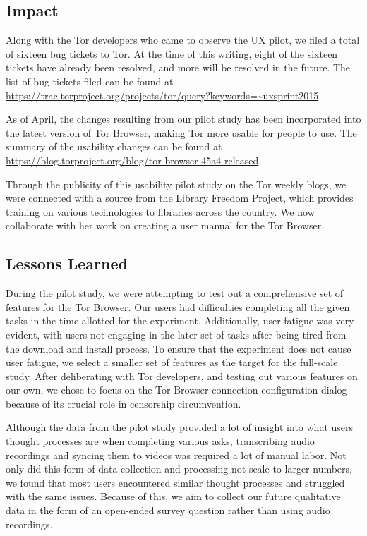 \documentclass[letterpaper,twocolumn,11pt]{article}
\begin{document}
\subsection{Impact}
\indent \indent Along with the Tor developers who came to observe the UX pilot, we filed 
a total of sixteen bug tickets to Tor. At the time of  this writing, eight of the sixteen tickets 
have already been resolved, and more will be resolved in the future.  The list of bug
tickets filed can be found at \url{https://trac.torproject.org/projects/tor/query?keywords=~uxsprint2015}. 

As of April, the changes resulting from our pilot study has been incorporated into the latest 
version of Tor Browser, making Tor more usable for people to use. 
The summary of the usability changes can be found at \url{https://blog.torproject.org/blog/tor-browser-45a4-released}. 

Through the publicity of this usability pilot study on the Tor weekly blogs, we were connected
with a source from the Library Freedom Project, which provides training on various technologies 
to libraries across the country. We now collaborate with her work on creating a user manual
for the Tor Browser. 

\subsection{Lessons Learned} 
\indent \indent During the pilot study, we were attempting to test out a comprehensive set of 
features for the Tor Browser. Our users had difficulties completing all the given tasks in the 
time allotted for the experiment. Additionally, user fatigue was very evident, with users not 
engaging in the later set of tasks after being tired from the download and install process. 
To ensure that the experiment does not cause user fatigue, we select a smaller set of features 
as the target for the full-scale study.  After deliberating with Tor developers, and testing out
various features on our own, we chose to focus on the Tor Browser connection configuration 
dialog because of its crucial role in censorship circumvention. 

Although the data from the pilot study provided a lot of insight into what users thought processes
are when completing various asks, transcribing audio recordings and syncing them to videos was
required a lot of manual labor. Not only did this form of data collection and processing not scale 
to larger numbers, we found that most users encountered similar thought processes and struggled
with the same issues. Because of this, we aim to collect our future qualitative data in the form of 
an open-ended survey question rather than using audio recordings. 
\end{document}
